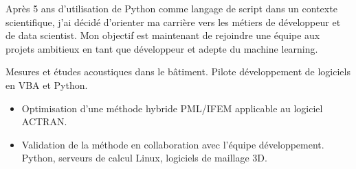 \documentclass[10pt,a4paper]{altacv}
\begin{document}

\begin{fullwidth}
\makecvheader
\begin{adjustwidth}{30pt}{30pt}
Apr\`es 5 ans d'utilisation de Python comme langage de script dans un contexte scientifique, j'ai d\'ecid\'e d'orienter ma carri\`ere vers les m\'etiers de d\'eveloppeur et de data scientist. Mon objectif est maintenant de rejoindre une \'equipe aux projets ambitieux en tant que d\'eveloppeur et adepte du machine learning.
\end{adjustwidth}
\end{fullwidth}




Mesures et \'etudes acoustiques dans le b\^atiment. Pilote d\'eveloppement de logiciels en VBA et Python.

\divider

\begin{itemize}
\item Optimisation d'une m\'ethode hybride PML/IFEM applicable au logiciel ACTRAN.
\item Validation de la m\'ethode en collaboration avec l'\'equipe d\'eveloppement. Python, serveurs de calcul Linux, logiciels de maillage 3D.
\end{itemize}

\divider
\end{document}
